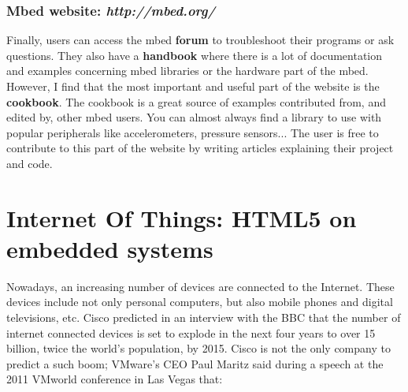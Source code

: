 \documentclass[pdftex,10pt,a4paper]{report}
\begin{document}
\subsection{Mbed website: \textit{http://mbed.org/}}
Finally, users can access the mbed \textbf{forum} to troubleshoot their programs or ask questions. They also have a \textbf{handbook} where there is a lot of documentation and examples concerning mbed libraries or the hardware part of the mbed. However, I find that the most important and useful part of the website is the \textbf{cookbook}. The cookbook is a great source of examples contributed from, and edited by, other mbed users. You can almost always find a library to use with popular peripherals like accelerometers, pressure sensors... The user is free to contribute to this part of the website by writing articles explaining their project and code. 

\chapter{Internet Of Things: HTML5 on embedded systems}
Nowadays, an increasing number of devices are connected to the Internet. These devices include not only personal computers, but also mobile phones and digital televisions, etc.
Cisco predicted in an interview with the BBC that the number of internet connected devices is set to explode in the next four years to over 15 billion, twice the world's population, by 2015. Cisco is not the only company to predict a such boom; VMware's CEO Paul Maritz said during a speech at the 2011 VMworld conference in Las Vegas that:
\end{document}

